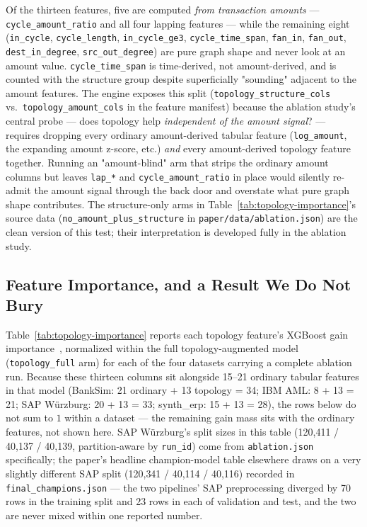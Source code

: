 Of the thirteen features, five are computed \emph{from transaction amounts}
— \texttt{cycle\_amount\_ratio} and all four lapping features — while the
remaining eight (\texttt{in\_cycle}, \texttt{cycle\_length},
\texttt{in\_cycle\_ge3}, \texttt{cycle\_time\_span}, \texttt{fan\_in},
\texttt{fan\_out}, \texttt{dest\_in\_degree}, \texttt{src\_out\_degree}) are
pure graph shape and never look at an amount value.
\texttt{cycle\_time\_span} is time-derived, not amount-derived, and is
counted with the structure group despite superficially "sounding" adjacent
to the amount features. The engine exposes this split (\texttt{topology\_structure\_cols}
vs.\ \texttt{topology\_amount\_cols} in the feature manifest) because the
ablation study's central probe — does topology help \emph{independent of the
amount signal}? — requires dropping every ordinary amount-derived tabular
feature (\texttt{log\_amount}, the expanding amount z-score, etc.)
\emph{and} every amount-derived topology feature together. Running an
"amount-blind" arm that strips the ordinary amount columns but leaves
\texttt{lap\_*} and \texttt{cycle\_amount\_ratio} in place would silently
re-admit the amount signal through the back door and overstate what pure
graph shape contributes. The structure-only arms in Table~\ref{tab:topology-importance}'s
source data (\texttt{no\_amount\_plus\_structure} in \texttt{paper/data/ablation.json})
are the clean version of this test; their interpretation is developed fully
in the ablation study.

\subsection{Feature Importance, and a Result We Do Not Bury}\label{sec:engine-finding}

Table~\ref{tab:topology-importance} reports each topology feature's XGBoost
gain importance~\cite{chen2016xgboost}, normalized within the full
topology-augmented model (\texttt{topology\_full} arm) for each of the four
datasets carrying a complete ablation run. Because these thirteen columns
sit alongside 15--21 ordinary tabular features in that model (BankSim: 21
ordinary + 13 topology = 34; IBM AML: 8 + 13 = 21; SAP Würzburg: 20 + 13 =
33; synth\_erp: 15 + 13 = 28), the rows below do not sum to $1$ within a
dataset — the remaining gain mass sits with the ordinary features, not shown
here. SAP Würzburg's split sizes in this table (120{,}411 / 40{,}137 /
40{,}139, partition-aware by \texttt{run\_id}) come from
\texttt{ablation.json} specifically; the paper's headline champion-model
table elsewhere draws on a very slightly different SAP split
(120{,}341 / 40{,}114 / 40{,}116) recorded in \texttt{final\_champions.json} — the
two pipelines' SAP preprocessing diverged by 70 rows in the training split
and 23 rows in each of validation and test, and
the two are never mixed within one reported number.

